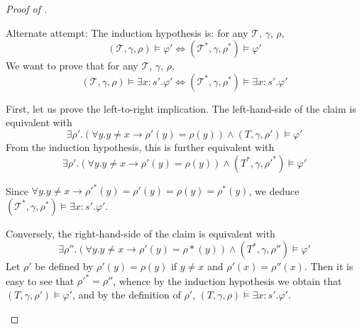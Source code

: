 \documentclass{article}
\begin{document}
\begin{proof}[Proof of ]
\begin{itemize}
    Alternate attempt:
    The induction hypothesis is: for any $\mathcal{T}$, $\gamma$, $\rho$, 
        $$(\mathcal{T}, \gamma, \rho) \vDash \varphi' \iff (\mathcal{T}^*, \gamma, \rho^\ast) \vDash \varphi'$$
    We want to prove that for any $\mathcal{T}$, $\gamma$, $\rho$, 
        $$(\mathcal{T}, \gamma, \rho) \vDash \exists x:s'. \varphi' \iff (\mathcal{T}^*, \gamma, \rho^\ast) \vDash \exists x:s'.\varphi'$$
    
    First, let us prove the left-to-right implication.
    The left-hand-side of the claim is equivalent with
    $$\exists \rho'. (\forall y. y \neq x \to \rho'(y) = \rho(y)) \wedge (T, \gamma, \rho') \vDash \varphi'$$
    From the induction hypothesis, this is further equivalent with
    $$\exists \rho'. (\forall y. y \neq x \to \rho'(y) = \rho(y)) \wedge (T^\ast, \gamma, {\rho'}^\ast) \vDash \varphi'$$
    
    Since $\forall y. y \neq x \to {\rho'}^\ast(y) = \rho'(y) = \rho(y) = \rho^\ast(y)$, we deduce $(\mathcal{T}^*, \gamma, \rho^\ast) \vDash \exists x:s'.\varphi'$.
    
    Conversely, the right-hand-side of the claim is equivalent with
    $$\exists \rho''. (\forall y. y \neq x \to \rho'(y) = \rho\ast(y)) \wedge (T^\ast, \gamma, \rho'') \vDash \varphi'$$
    Let $\rho'$ be defined by $\rho'(y) = \rho(y)$ if $y\neq x$ and $\rho'(x) = \rho''(x)$. Then it is
    easy to see that ${\rho'}^\ast = \rho''$, whence by the induction hypothesis we obtain that
    $(T, \gamma, \rho') \vDash \varphi'$, and by the definition of $\rho'$, $(T, \gamma, \rho) \vDash \exists x:s'. \varphi'$.
 \end{itemize}
\end{proof}
\end{document}

